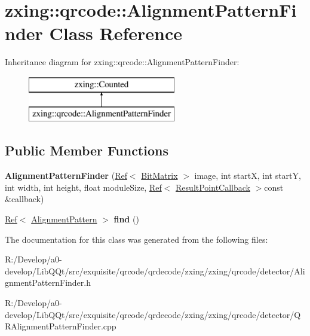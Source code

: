 \hypertarget{classzxing_1_1qrcode_1_1_alignment_pattern_finder}{}\section{zxing\+:\+:qrcode\+:\+:Alignment\+Pattern\+Finder Class Reference}
\label{classzxing_1_1qrcode_1_1_alignment_pattern_finder}
Inheritance diagram for zxing\+:\+:qrcode\+:\+:Alignment\+Pattern\+Finder\+:\begin{figure}[H]
\begin{center}
\leavevmode
\includegraphics[height=2.000000cm]{classzxing_1_1qrcode_1_1_alignment_pattern_finder}
\end{center}
\end{figure}
\subsection*{Public Member Functions}
\begin{DoxyCompactItemize}
\item 
\mbox{\label{classzxing_1_1qrcode_1_1_alignment_pattern_finder_a237f79d173802940b1a7b0cabb88cd54}} 
{\bfseries Alignment\+Pattern\+Finder} (\mbox{\hyperlink{classzxing_1_1_ref}{Ref}}$<$ \mbox{\hyperlink{classzxing_1_1_bit_matrix}{Bit\+Matrix}} $>$ image, int startX, int startY, int width, int height, float module\+Size, \mbox{\hyperlink{classzxing_1_1_ref}{Ref}}$<$ \mbox{\hyperlink{classzxing_1_1_result_point_callback}{Result\+Point\+Callback}} $>$const \&callback)
\item 
\mbox{\label{classzxing_1_1qrcode_1_1_alignment_pattern_finder_a48a2c4a1d277de0d05b1558d76fc9d1f}} 
\mbox{\hyperlink{classzxing_1_1_ref}{Ref}}$<$ \mbox{\hyperlink{classzxing_1_1qrcode_1_1_alignment_pattern}{Alignment\+Pattern}} $>$ {\bfseries find} ()
\end{DoxyCompactItemize}


The documentation for this class was generated from the following files\+:\begin{DoxyCompactItemize}
\item 
R\+:/\+Develop/a0-\/develop/\+Lib\+Q\+Qt/src/exquisite/qrcode/qrdecode/zxing/zxing/qrcode/detector/Alignment\+Pattern\+Finder.\+h\item 
R\+:/\+Develop/a0-\/develop/\+Lib\+Q\+Qt/src/exquisite/qrcode/qrdecode/zxing/zxing/qrcode/detector/Q\+R\+Alignment\+Pattern\+Finder.\+cpp\end{DoxyCompactItemize}
